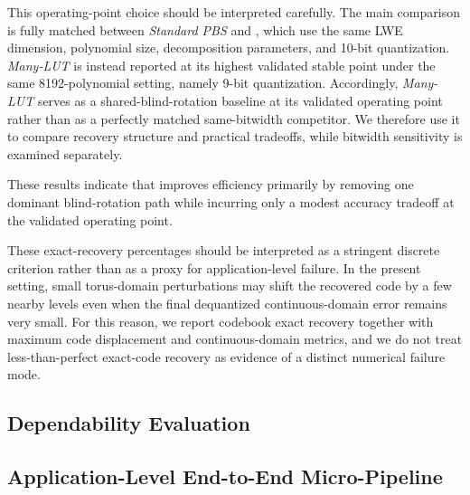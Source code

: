 This operating-point choice should be interpreted carefully. The main comparison is fully matched between \emph{Standard PBS} and \emph{\SDRPBS}, which use the same LWE dimension, polynomial size, decomposition parameters, and 10-bit quantization. \emph{Many-LUT} is instead reported at its highest validated stable point under the same 8192-polynomial setting, namely 9-bit quantization. Accordingly, \emph{Many-LUT} serves as a shared-blind-rotation baseline at its validated operating point rather than as a perfectly matched same-bitwidth competitor. We therefore use it to compare recovery structure and practical tradeoffs, while bitwidth sensitivity is examined separately.

These results indicate that \SDRPBS improves efficiency primarily by removing one dominant blind-rotation path while incurring only a modest accuracy tradeoff at the validated operating point.

These exact-recovery percentages should be interpreted as a stringent discrete criterion rather than as a proxy for application-level failure. In the present setting, small torus-domain perturbations may shift the recovered code by a few nearby levels even when the final dequantized continuous-domain error remains very small. For this reason, we report codebook exact recovery together with maximum code displacement and continuous-domain metrics, and we do not treat less-than-perfect exact-code recovery as evidence of a distinct numerical failure mode.

\subsection{Dependability Evaluation}
\label{subsec:stability_results}

\subsection{Application-Level End-to-End Micro-Pipeline}
\label{subsec:end_to_end_results}

